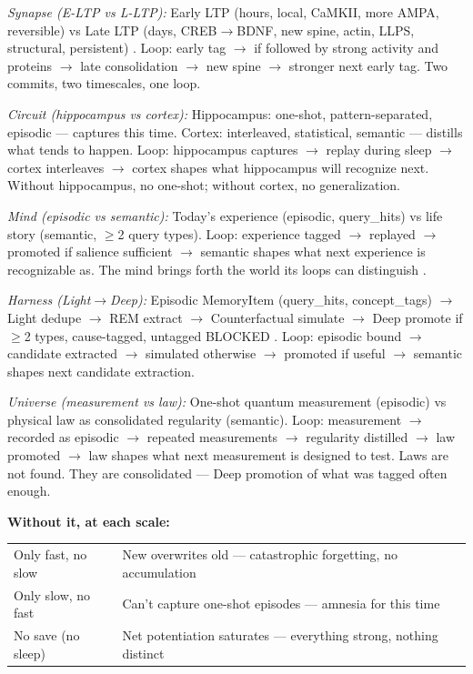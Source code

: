 \documentclass[11pt]{article}
\begin{document}
\textit{Synapse (E-LTP vs L-LTP):} Early LTP (hours, local, CaMKII, more AMPA, reversible) vs Late LTP (days, CREB$\to$BDNF, new spine, actin, LLPS, structural, persistent) \citep{tononi2014}. Loop: early tag $\to$ if followed by strong activity and proteins $\to$ late consolidation $\to$ new spine $\to$ stronger next early tag. Two commits, two timescales, one loop.

\textit{Circuit (hippocampus vs cortex):} Hippocampus: one-shot, pattern-separated, episodic --- captures this time. Cortex: interleaved, statistical, semantic --- distills what tends to happen. Loop: hippocampus captures $\to$ replay during sleep $\to$ cortex interleaves $\to$ cortex shapes what hippocampus will recognize next. Without hippocampus, no one-shot; without cortex, no generalization.

\textit{Mind (episodic vs semantic):} Today's experience (episodic, query\_hits) vs life story (semantic, $\geq$2 query types). Loop: experience tagged $\to$ replayed $\to$ promoted if salience sufficient $\to$ semantic shapes what next experience is recognizable as. The mind brings forth the world its loops can distinguish \citep{maturana1980}.

\textit{Harness (Light$\to$Deep):} Episodic MemoryItem (query\_hits, concept\_tags) $\to$ Light dedupe $\to$ REM extract $\to$ Counterfactual simulate $\to$ Deep promote if $\geq$2 types, cause-tagged, untagged BLOCKED \citep{tononi2014}. Loop: episodic bound $\to$ candidate extracted $\to$ simulated otherwise $\to$ promoted if useful $\to$ semantic shapes next candidate extraction.

\textit{Universe (measurement vs law):} One-shot quantum measurement (episodic) vs physical law as consolidated regularity (semantic). Loop: measurement $\to$ recorded as episodic $\to$ repeated measurements $\to$ regularity distilled $\to$ law promoted $\to$ law shapes what next measurement is designed to test. Laws are not found. They are consolidated --- Deep promotion of what was tagged often enough.

\textbf{Without it, at each scale:}

\begin{center}
\small
\begin{tabular}{p{2.6cm}p{6.2cm}}
\toprule
Only fast, no slow & New overwrites old --- catastrophic forgetting, no accumulation \\
Only slow, no fast & Can't capture one-shot episodes --- amnesia for this time \\
No save (no sleep) & Net potentiation saturates --- everything strong, nothing distinct \\
\bottomrule
\end{tabular}
\end{center}
\end{document}
